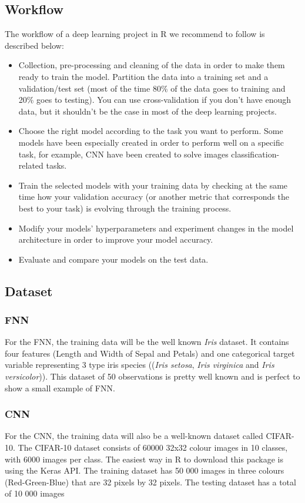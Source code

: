 \documentclass[letter,8pt]{article}\usepackage[]{graphicx}\usepackage[]{color}
\begin{document}
\subsection{Workflow}
The workflow of a deep learning project in R we recommend to follow is described below:
\begin{itemize}
\item Collection, pre-processing and cleaning of the data in order to make them ready to train the model. Partition the data into a training set and a validation/test set (most of the time 80\% of the data goes to training and 20\% goes to testing). You can use cross-validation if you don't have enough data, but it shouldn't be the case in most of the deep learning projects.
\item Choose the right model according to the task you want to perform. Some models have been especially created in order to perform well on a specific task, for example, CNN have been created to solve images classification-related tasks.
\item Train the selected models with your training data by checking at the same time how your validation accuracy (or another metric that corresponds the best to your task) is evolving through the training process.
\item Modify your models' hyperparameters and experiment changes in the model architecture in order to improve your model accuracy.
\item Evaluate and compare your models on the test data.
\end{itemize}
\subsection{Dataset}
\subsubsection{FNN}
For the FNN, the training data will be the well known \textit{Iris} dataset. It contains four features (Length and Width of Sepal and Petals) and one categorical target variable representing 3 type iris species ((\textit{Iris setosa}, \textit{Iris virginica} and \textit{Iris versicolor})).  This dataset of 50 observations is pretty well known and is perfect to show a small example of FNN. 

\subsubsection{CNN}
For the CNN, the training data will also be a well-known dataset called CIFAR-10. The CIFAR-10 dataset consists of 60000 32x32 colour images in 10 classes, with 6000 images per class. The easiest way in R to download this package is using the Keras API. The training dataset has 50 000 images in three colours (Red-Green-Blue) that are 32 pixels by 32 pixels. The testing dataset has a total of 10 000 images
\end{document}
